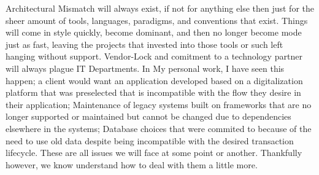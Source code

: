 \documentclass[14pt]{article}
\begin{document}
Architectural Mismatch will always exist, if not for anything else then just for the sheer amount of tools, languages, paradigms, and conventions that exist. Things will come in style quickly, become dominant, and then no longer become mode just as fast, leaving the projects that invested into those tools or such left hanging without support. Vendor-Lock and comitment to a technology partner will always plague IT Departments.  In My personal work, I have seen this happen; a client would want an application developed based on a digitalization platform that was preselected that is incompatible with the flow they desire in their application; Maintenance of legacy systems built on frameworks that are no longer supported or maintained but cannot be changed due to dependencies elsewhere in the systems; Database choices that were commited to because of the need to use old data despite being incompatible with the desired transaction lifecycle. These are all issues we will face at some point or another. Thankfully however, we know understand how to deal with them a little more. 





\end{document}
